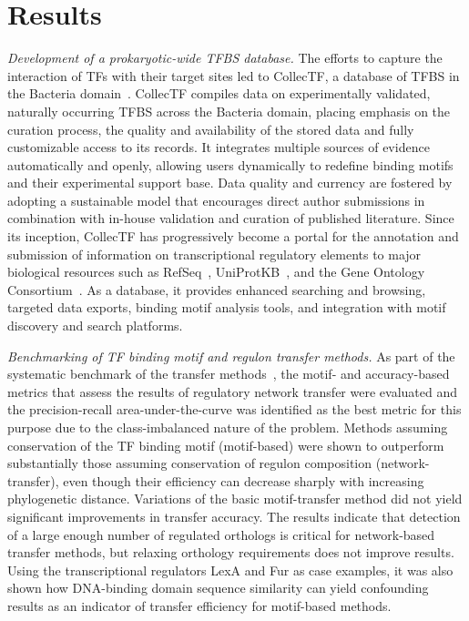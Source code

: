 \section{Results}

\textit{Development of a prokaryotic-wide TFBS database.}  The efforts to
capture the interaction of TFs with their target sites led to CollecTF, a
database of TFBS in the Bacteria domain~\citep{kilic2013collectf,
  kilic2016data}. CollecTF compiles data on experimentally validated,
naturally occurring TFBS across the Bacteria domain, placing emphasis on
the curation process, the quality and availability of the stored data and fully
customizable access to its records. It integrates multiple sources of evidence
automatically and openly, allowing users dynamically to redefine binding motifs
and their experimental support base. Data quality and currency are fostered by
adopting a sustainable model that encourages direct author submissions in
combination with in-house validation and curation of published
literature. Since its inception, CollecTF has progressively become a portal for
the annotation and submission of information on transcriptional regulatory
elements to major biological resources such as RefSeq~\citep{o2015reference},
UniProtKB~\citep{uniprot2014uniprot}, and the Gene Ontology
Consortium~\citep{gene2013gene}. As a database, it provides enhanced searching and
browsing, targeted data exports, binding motif analysis tools, and integration
with motif discovery and search platforms.

\textit{Benchmarking of TF binding motif and regulon transfer methods.}  As
part of the systematic benchmark of the transfer
methods~\citep{kilic2015assessment}, the motif- and accuracy-based metrics that
assess the results of regulatory network transfer were evaluated and the
precision-recall area-under-the-curve was identified as the best metric for
this purpose due to the class-imbalanced nature of the problem. Methods
assuming conservation of the TF binding motif (motif-based) were shown to
outperform substantially those assuming conservation of regulon composition
(network-transfer), even though their efficiency can decrease sharply with
increasing phylogenetic distance. Variations of the basic motif-transfer method
did not yield significant improvements in transfer accuracy. The results
indicate that detection of a large enough number of regulated orthologs is
critical for network-based transfer methods, but relaxing orthology
requirements does not improve results. Using the transcriptional regulators
LexA and Fur as case examples, it was also shown how DNA-binding domain
sequence similarity can yield confounding results as an indicator of transfer
efficiency for motif-based methods.

